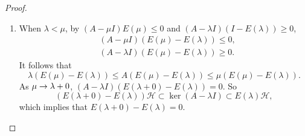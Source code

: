 \documentclass[a4paper,12pt]{article}
\begin{document}
\begin{proof}
\begin{enumerate}[label=(\arabic{*})]
        \item When $\lambda < \mu$, by $(A - \mu I)E(\mu) \leq 0$ and $(A -\lambda I)(I - E(\lambda)) \geq 0$,
        \begin{equation*}
            \begin{aligned}
                & (A-\mu I)(E(\mu)-E(\lambda)) \leq 0, \\
                & (A-\lambda I)(E(\mu)-E(\lambda)) \geq 0.
            \end{aligned}
        \end{equation*}
        It follows that
        \begin{equation*}
            \lambda(E(\mu)-E(\lambda)) \leq A(E(\mu)-E(\lambda)) \leq \mu(E(\mu)-E(\lambda)).
        \end{equation*}
        As $\mu \rightarrow \lambda + 0$, $(A-\lambda I)(E(\lambda+0)-E(\lambda))=0$. So
        \begin{equation*}
            (E(\lambda+0)-E(\lambda))\mathcal{H} \subset \operatorname{ker}(A-\lambda I) \subset E(\lambda)\mathcal{H},
        \end{equation*}
        which implies that $E(\lambda + 0) - E(\lambda) = 0$.


\end{enumerate}
\end{proof}
\end{document}
